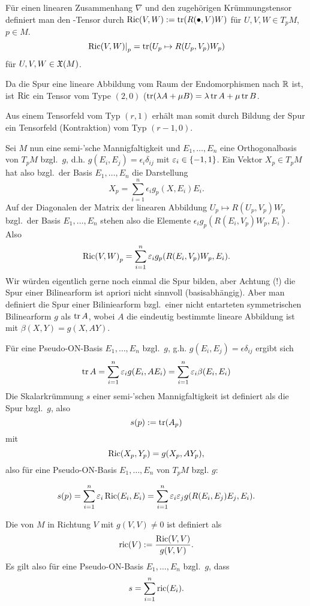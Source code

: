 \documentclass{article}
\begin{document}
\begin{definition}
    Für einen linearen Zusammenhang $\nabla$ und den zugehörigen Krümmungstensor definiert man den -Tensor durch $\mathop\mathrm{Ric}(V,W):=\mathop\mathrm{tr}(R(\bullet,V)W)$ für $U,V,W\in T_p M$, $p\in M$.
    $$
    \left. \mathop\mathrm{Ric}(V,W)\right\vert_p=\mathop\mathrm{tr}(U_p\mapsto R(U_p,V_p)W_p)
    $$
    für $U,V,W\in \mathfrak{X}(M)$.
\end{definition}

Da die Spur eine lineare Abbildung vom Raum der Endomorphismen nach $\mathbb{R}$ ist, ist $\mathop\mathrm{Ric}$ ein Tensor vom Type $(2,0)$ ($\mathop\mathrm{tr}(\lambda A+\mu B)=\lambda\mathop\mathrm{tr} A+\mu \mathop\mathrm{tr} B$.

\begin{remark}
    Aus einem Tensorfeld vom Typ $(r,1)$ erhält man somit durch Bildung der Spur ein Tensorfeld (Kontraktion) vom Typ $(r-1,0)$.
\end{remark}

Sei $M$ nun eine semi-'sche Mannigfaltigkeit und $E_1,\ldots, E_n$ eine Orthogonalbasis von $T_p M$ bzgl.~$g$, d.h. $g(E_i,E_j)=\epsilon_i\delta_{ij}$ mit $\epsilon_i\in\set{-1,1}$. Ein Vektor $X_p\in T_p M$ hat also bzgl.~der Basis $E_1,\ldots,E_n$ die Darstellung
$$
X_p=\sum_{i=1}^n\epsilon_ig_p(X,E_i)E_i.
$$
Auf der Diagonalen der Matrix der linearen Abbildung $U_p\mapsto R(U_p,V_p)W_p$ bzgl.~der Basis $E_1,\ldots,E_n$ stehen also die Elemente $\epsilon_i g_p(R(E_i,V_p)W_p,E_i)$. Also
$$
{\mathop\mathrm{Ric}(V,W)}_p=\sum_{i=1}^n{\varepsilon_i g_p(R(E_i,V_p)W_p,E_i)}.
$$
Wir würden eigentlich gerne noch einmal die Spur bilden, aber Achtung (!) die Spur einer Bilinearform ist apriori nicht sinnvoll (basisabhängig). Aber man definiert die Spur einer Biliniearform bzgl.~einer nicht entarteten symmetrischen Bilinearform $g$ als $\mathop\mathrm{tr} A$, wobei $A$ die eindeutig bestimmte lineare Abbildung ist mit $\beta(X,Y)=g(X,AY)$.

Für eine Pseudo-ON-Basis $E_1,\ldots,E_n$ bzgl.~$g$, g.h. $g(E_i,E_j)=\epsilon\delta_{ij}$ ergibt sich
$$
\mathop\mathrm{tr} A = \sum_{i=1}^n{\varepsilon_i g(E_i,A E_i)} = \sum_{i=1}^n{\varepsilon_i\beta(E_i,E_i)}
$$ 
Die Skalarkrümmung $s$ einer semi-'schen Mannigfaltigkeit ist definiert als die Spur bzgl.~$g$, also
$$
s(p):=\mathop\mathrm{tr}(A_p)
$$
mit
$$
\mathop\mathrm{Ric}(X_p,Y_p)=g(X_p,AY_p),
$$
also für eine Pseudo-ON-Basis $E_1,\ldots,E_n$ von $T_p M$ bzgl. $g$:
\begin{framed}
$$
s(p)=\sum_{i=1}^n{\varepsilon_i\mathop\mathrm{Ric}(E_i,E_i)}=\sum_{i=1}^n{\varepsilon_i\varepsilon_j g(R(E_i,E_j)E_j,E_i)}.
$$
\end{framed}

\begin{definition}
    Die  von $M$ in Richtung $V$ mit $g(V,V)\neq 0$ ist definiert als
    $$
    \mathop\mathrm{ric}(V):=\frac{\mathop\mathrm{Ric}(V,V)}{g(V,V)}.
    $$
    Es gilt also für eine Pseudo-ON-Basis $E_1,\ldots,E_n$ bzgl.~$g$, dass
    $$
    s=\sum_{i=1}^n{\mathop\mathrm{ric}(E_i)}.
    $$
\end{definition}
\end{document}
